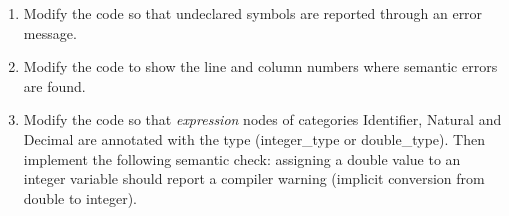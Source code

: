 \begin{enumerate}
\item Modify the code so that undeclared symbols are reported through an error message.
\item Modify the code to show the line and column numbers where semantic errors are found.
\item Modify the code so that \textit{expression} nodes of categories Identifier, Natural and Decimal are annotated with the type (integer\_type or double\_type). Then implement the following semantic check: assigning a double value to an integer variable should report a compiler warning (implicit conversion from double to integer).
\end{enumerate}